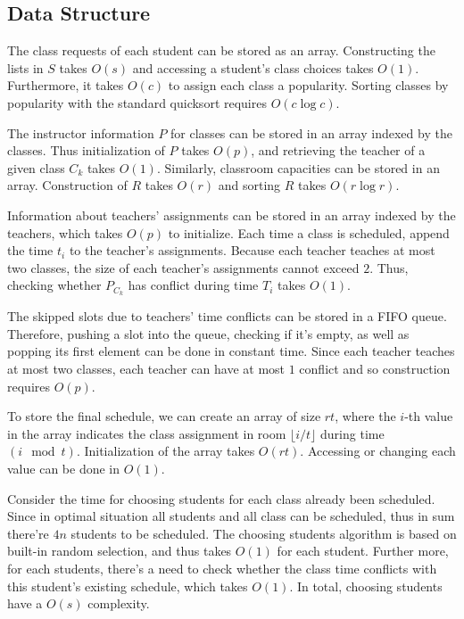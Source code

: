 \documentclass[11pt, oneside]{article}   	%
\begin{document}
\subsection{Data Structure}
The class requests of each student can be stored as an array. Constructing the lists in $S$ takes $O(s)$ and accessing a student's class choices takes $O(1)$. Furthermore, it takes $O(c)$ to assign each class a popularity. Sorting classes by popularity with the standard quicksort requires $O(c\log c)$.\par
The instructor information $P$ for classes can be stored in an array indexed by the classes. Thus initialization of $P$ takes $O(p)$, and retrieving the teacher of a given class $C_k$ takes $O(1)$. Similarly, classroom capacities can be stored in an array. Construction of $R$ takes $O(r)$ and sorting $R$ takes $O(r\log r)$.\par
Information about teachers' assignments can be stored in an array indexed by the teachers, which takes $O(p)$ to initialize. Each time a class is scheduled, append the time $t_i$ to the teacher's assignments. Because each teacher teaches at most two classes, the size of each teacher's assignments cannot exceed $2$. Thus, checking whether $P_{C_k}$ has conflict during time $T_i$ takes $O(1)$.\par
The skipped slots due to teachers' time conflicts can be stored in a FIFO queue. Therefore, pushing a slot into the queue, checking if it's empty, as well as popping its first element can be done in constant time. Since each teacher teaches at most two classes, each teacher can have at most $1$ conflict and so construction requires $O(p)$.\par
To store the final schedule, we can create an array of size $rt$, where the $i$-th value in the array indicates the class assignment in room $\lfloor i / t\rfloor$ during time $(i\mod t)$. Initialization of the array takes $O(rt)$. Accessing or changing each value can be done in $O(1)$.\par
Consider the time for choosing students for each class already been scheduled. Since in optimal situation all students and all class can be scheduled, thus in sum there're $4n$ students to be scheduled. The choosing students algorithm is based on built-in random selection, and thus takes $O(1)$ for each student. Further more, for each students, there's a need to check whether the class time conflicts with this student's existing schedule, which takes $O(1)$. In total, choosing students have a $O(s)$ complexity.
\end{document}
